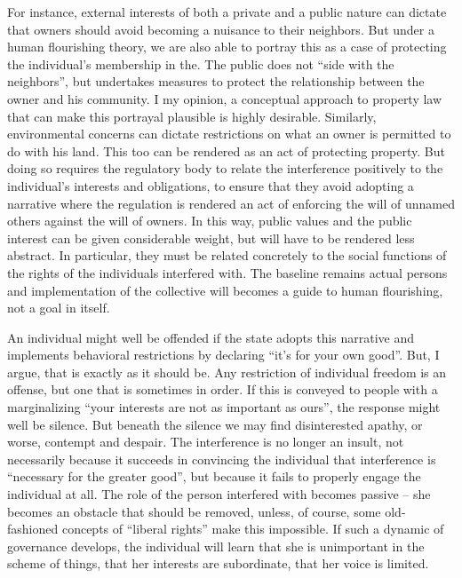 For instance, external interests of both a private and a public nature can dictate that owners should avoid becoming a nuisance to their neighbors. But under a human flourishing theory, we are also able to portray this as a case of protecting the individual's membership in the. The public does not ``side with the neighbors'', but undertakes measures to protect the relationship between the owner and his community. I my opinion, a conceptual approach to property law that can make this portrayal plausible is highly desirable. Similarly, environmental concerns can dictate restrictions on what an owner is permitted to do with his land. This too can be rendered as an act of protecting property. But doing so requires the regulatory body to relate the interference positively to the individual's interests and obligations, to ensure that they avoid adopting a narrative where the regulation is rendered an act of enforcing the will of unnamed others against the will of owners. In this way, public values and the public interest can be given considerable weight, but will have to be rendered less abstract. In particular, they must be related concretely to the social functions of the rights of the individuals interfered with. The baseline remains actual persons and implementation of the collective will becomes a guide to human flourishing, not a goal in itself.

An individual might well be offended if the state adopts this narrative and implements behavioral restrictions by declaring ``it's for your own good''. But, I argue, that is exactly as it should be. Any restriction of individual freedom is an offense, but one that is sometimes in order. If this is conveyed to people with a marginalizing ``your interests are not as important as ours'', the response might well be silence. But beneath the silence we may find disinterested apathy, or worse, contempt and despair. The interference is no longer an insult, not necessarily because it succeeds in convincing the individual that interference is ``necessary for the greater good'', but because it fails to properly engage the individual at all. The role of the person interfered with becomes passive -- she becomes an obstacle that should be removed, unless, of course, some old-fashioned concepts of ``liberal rights'' make this impossible. If such a dynamic of governance develops, the individual will learn that she is unimportant in the scheme of things, that her interests are subordinate, that her voice is limited. 

